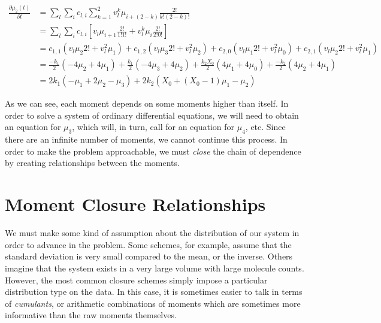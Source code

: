 \documentclass[a4paper,10pt]{article}
\begin{document}
\begin{align*}
 \frac{\partial \mu_2 (t)}{\partial t} &= \sum_l \sum_i c_{l,i} \sum_{k=1}^2 v_l^k \mu_{i+(2-k)} \frac{2!}{k!(2-k)!}\\
 &=\sum_l \sum_i c_{l,i} \left[ v_l \mu_{i+1} \frac{2!}{1!1!}+v_l^k \mu_{i} \frac{2!}{2!0!}\right]\\
 &= c_{1,1}(v_l \mu_{2} 2!+v_l^2 \mu_1)+c_{1,2}(v_l \mu_{3} 2!+v_l^2 \mu_2)+c_{2,0}(v_l \mu_{1} 2!+v_l^2 \mu_0)+c_{2,1}(v_l \mu_{2} 2!+v_l^2 \mu_1)\\
 &= \frac{-k_1}{2}(-4\mu_2+4\mu_1)+\frac{k_1}{2}(-4\mu_3+4\mu_2)+\frac{k_2 X_0}{2}(4\mu_1+4\mu_0)+\frac{-k_2}{2}(4\mu_2+4\mu_1)\\
 &=2k_1(-\mu_1+2\mu_2-\mu_3)+2k_2(X_0+(X_0-1)\mu_1-\mu_2)
\end{align*}
 
 As we can see, each moment depends on some moments higher than itself. In order to solve a system of ordinary differential equations, we will need to obtain an equation for $\mu_3$, which will, in turn, call for an equation for $\mu_4$, etc. Since there are an infinite number of moments, we cannot continue this process. In order to make the problem approachable, we must \textit{close} the chain of dependence by creating relationships between the moments. 
 
 \section{Moment Closure Relationships}
 
 We must make some kind of assumption about the distribution of our system in order to advance in the problem. Some schemes, for example, assume that the standard deviation is very small compared to the mean, or the inverse. Others imagine that the system exists in a very large volume with large molecule counts. However, the most common closure schemes simply impose a particular distribution type on the data. In this case, it is sometimes easier to talk in terms of \textit{cumulants}, or arithmetic combinations of moments which are sometimes more informative than the raw moments themselves. 
 
\end{document}
